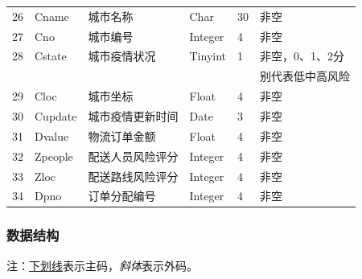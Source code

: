 \documentclass[12pt]{article}
\begin{document}
\begin{center}
\begin{supertabular}{llllll}
	26 &	Cname &	城市名称 &	Char &	30 	& 非空 \\
	27 &	Cno &	城市编号 &	Integer &	4 &	非空 \\
	28 &	Cstate &	城市疫情状况 &	Tinyint &	1 &	 非空，0、1、2分\\ &&&&& 别代表低中高风险 \\
	29 &	Cloc &	城市坐标 &	Float &	4 &	非空 \\
	30 &	Cupdate &	城市疫情更新时间 &	Date &	3 &	非空 \\
	31 &	Dvalue 	& 物流订单金额 	& Float &	4 &	非空 \\
	32 &	Zpeople & 配送人员风险评分 & Integer & 4 & 非空 \\
	33 &	Zloc & 配送路线风险评分 & Integer & 4 & 非空 \\
	34 &	Dpno & 订单分配编号 & Integer & 4 & 非空 \\
\end{supertabular}
\end{center}

\newpage
\subsubsection{数据结构}

注：\underline{下划线}表示主码，\textit{斜体}表示外码。

\tabletail{\bottomrule}
\end{document}
